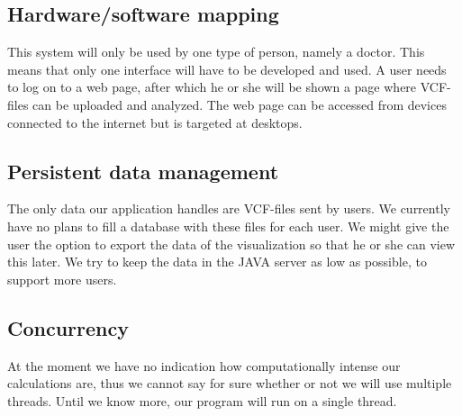 	\subsection{Hardware/software mapping}
		This system will only be used by one type of person, namely a doctor. This means that only one interface will have to be developed and used. A user needs to log on to a web page, after which he or she will be shown a page where VCF-files can be uploaded and analyzed. The web page can be accessed from devices connected to the internet but is targeted at desktops.
	\subsection{Persistent data management}
		The only data our application handles are VCF-files sent by users. We currently have no plans to fill a database with these files for each user. We might give the user the option to export the data of the visualization so that he or she can view this later. We try to keep the data in the JAVA server as low as possible, to support more users.
	\subsection{Concurrency }
		At the moment we have no indication how computationally intense our calculations are, thus we cannot say for sure whether or not we will use multiple threads. Until we know more, our program will run on a single thread.
		